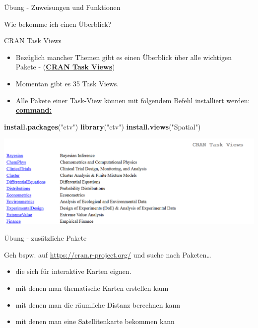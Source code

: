 \documentclass[ignorenonframetext,]{beamer}
\newenvironment{Shaded}{\begin{snugshade}}{\end{snugshade}}
\newcommand{\KeywordTok}[1]{\textcolor[rgb]{0.26,0.66,0.93}{\textbf{#1}}}
\newcommand{\NormalTok}[1]{\textcolor[rgb]{0.74,0.68,0.62}{#1}}
\newcommand{\StringTok}[1]{\textcolor[rgb]{0.02,0.61,0.04}{#1}}
\providecommand{\tightlist}{%
  \setlength{\itemsep}{0pt}\setlength{\parskip}{0pt}}
\begin{document}
\begin{frame}[fragile]{Übung - Zuweisungen und Funktionen}
\begin{frame}{Wie bekomme ich einen Überblick?}
\end{frame}

\begin{frame}[fragile]{CRAN Task Views}
\protect\hypertarget{cran-task-views}{}

\begin{itemize}
\tightlist
\item
  Bezüglich mancher Themen gibt es einen Überblick über alle wichtigen
  Pakete - (\href{https://cran.r-project.org/web/views/}{\textbf{CRAN
  Task Views}})
\item
  Momentan gibt es 35 Task Views.
\item
  Alle Pakete einer Task-View können mit folgendem Befehl installiert
  werden:
  \href{https://mran.microsoft.com/rpackages/}{\textbf{command:}}
\end{itemize}

\begin{Shaded}
\begin{Highlighting}[]
\KeywordTok{install.packages}\NormalTok{(}\StringTok{"ctv"}\NormalTok{)}
\KeywordTok{library}\NormalTok{(}\StringTok{"ctv"}\NormalTok{)}
\KeywordTok{install.views}\NormalTok{(}\StringTok{"Spatial"}\NormalTok{)}
\end{Highlighting}
\end{Shaded}

\includegraphics{figure/CRANtaskViews.PNG}

\end{frame}

\begin{frame}{Übung - zusätzliche Pakete}
\protect\hypertarget{ubung---zusatzliche-pakete}{}

Geh bspw. auf \url{https://cran.r-project.org/} und suche nach
Paketen\ldots{}

\begin{itemize}
\tightlist
\item
  die sich für interaktive Karten eignen.
\item
  mit denen man thematische Karten erstellen kann
\item
  mit denen man die räumliche Distanz berechnen kann
\item
  mit denen man eine Satellitenkarte bekommen kann
\end{itemize}


\end{frame}
\end{frame}
\end{document}

